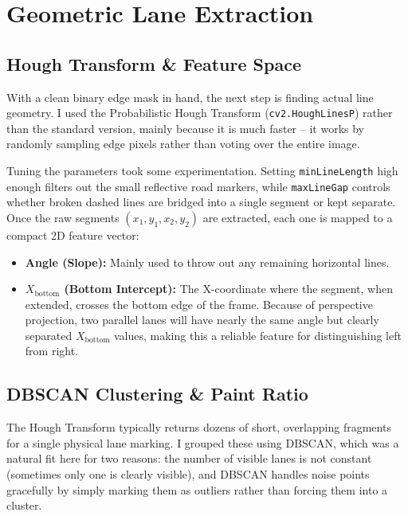 \documentclass[a4paper, 11pt]{article}
\begin{document}
	\section{Geometric Lane Extraction}
	
	\subsection{Hough Transform \& Feature Space}
	With a clean binary edge mask in hand, the next step is finding actual line geometry. I used the Probabilistic Hough Transform (\texttt{cv2.HoughLinesP}) rather than the standard version, mainly because it is much faster -- it works by randomly sampling edge pixels rather than voting over the entire image.
	
	Tuning the parameters took some experimentation. Setting \texttt{minLineLength} high enough filters out the small reflective road markers, while \texttt{maxLineGap} controls whether broken dashed lines are bridged into a single segment or kept separate. Once the raw segments $(x_1, y_1, x_2, y_2)$ are extracted, each one is mapped to a compact 2D feature vector:
	
	\begin{itemize}
		\item \textbf{Angle (Slope):} Mainly used to throw out any remaining horizontal lines.
		\item \textbf{$X_{\text{bottom}}$ (Bottom Intercept):} The X-coordinate where the segment, when extended, crosses the bottom edge of the frame. Because of perspective projection, two parallel lanes will have nearly the same angle but clearly separated $X_{\text{bottom}}$ values, making this a reliable feature for distinguishing left from right.
	\end{itemize}
	
	\subsection{DBSCAN Clustering \& Paint Ratio}
	The Hough Transform typically returns dozens of short, overlapping fragments for a single physical lane marking. I grouped these using DBSCAN, which was a natural fit here for two reasons: the number of visible lanes is not constant (sometimes only one is clearly visible), and DBSCAN handles noise points gracefully by simply marking them as outliers rather than forcing them into a cluster.
	
\end{document}
